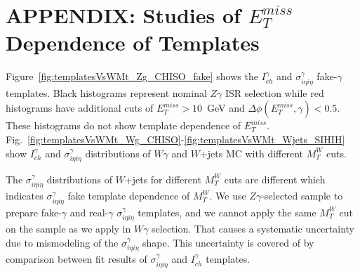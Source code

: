 \section{APPENDIX: Studies of $E_T^{miss}$ Dependence of Templates}
\label{sec:CompareTemplatesPlots}

Figure~\ref{fig:templatesVsWMt_Zg_CHISO_fake} shows the $I_{ch}^{\gamma}$ and $\sigma_{i\eta i\eta}^{\gamma}$ fake-$\gamma$ templates. Black histograms represent nominal $Z\gamma$ ISR selection while red histograms have additional cuts of $E_T^{miss}>10$~GeV and $\Delta \phi(E_T^{miss},\gamma)<0.5$. These histograms do not show template dependence of $E_T^{miss}$. Fig.~\ref{fig:templatesVsWMt_Wg_CHISO}-\ref{fig:templatesVsWMt_Wjets_SIHIH} show $I_{ch}^\gamma$ and $\sigma_{i \eta i \eta}^{\gamma}$ distributions of $W\gamma$ and $W$+jets MC with different $M_T^W$ cuts. 

The $\sigma_{i \eta i \eta}^\gamma$ distributions of $W$+jets for different $M_T^W$ cuts are different which indicates $\sigma_{i \eta i\eta}^\gamma$ fake template dependence of $M_T^W$. We use $Z\gamma$-selected sample to prepare fake-$\gamma$ and real-$\gamma$ $\sigma_{i \eta i \eta}^\gamma$ templates, and we cannot apply the same $M_T^W$ cut on the sample as we apply in $W\gamma$ selection. That causes a systematic uncertainty due to mismodeling of the $\sigma_{i \eta i \eta}^{\gamma}$ shape. This uncertainty is covered of by comparison between fit results of $\sigma_{i \eta i \eta}^{\gamma}$ and $I_{ch}^\gamma$ templates.

